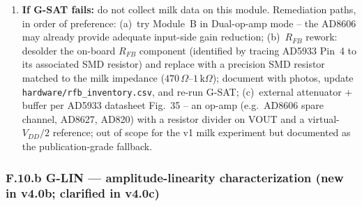 \documentclass[11pt,a4paper]{article}
\newcommand{\kohm}[1]{\ensuremath{#1\,\mathrm{k}\Omega}}
\newcommand{\Rohm}[1]{\ensuremath{#1\,\Omega}}
\begin{document}
\begin{gatebox}
\begin{enumerate}
\item \textbf{If G-SAT fails:} do not collect milk data on this module. Remediation paths, in order of preference: (a)~try Module~B in Dual-op-amp mode -- the AD8606 may already provide adequate input-side gain reduction; (b)~$R_{FB}$ rework: desolder the on-board $R_{FB}$ component (identified by tracing AD5933 Pin~4 to its associated SMD resistor) and replace with a precision SMD resistor matched to the milk impedance (\Rohm{470}--\kohm{1}); document with photos, update \texttt{hardware/rfb\_inventory.csv}, and re-run G-SAT; (c)~external attenuator + buffer per AD5933 datasheet Fig.~35 \cite{ad5933ds} -- an op-amp (e.g.\ AD8606 spare channel, AD8627, AD820) with a resistor divider on VOUT and a virtual-$V_{DD}/2$ reference; out of scope for the v1 milk experiment but documented as the publication-grade fallback.
\end{enumerate}
\end{gatebox}

\subsubsection*{F.10.b G-LIN --- amplitude-linearity characterization (new in v4.0b; clarified in v4.0c)}
\end{document}
